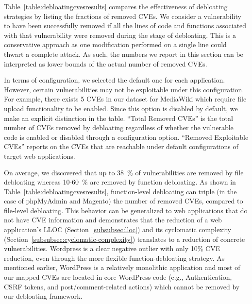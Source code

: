 Table~\ref{table:debloatingcvesresults} compares the effectiveness of
debloating strategies by listing the fractions of removed CVEs. We consider
a vulnerability to have been successfully removed if all the lines of code
and functions associated with that vulnerability were removed during the
stage of debloating. This is a conservative approach as one modification
performed on a single line could thwart a complete attack. As such, the
numbers we report in this section can be interpreted as lower bounds of
the actual number of removed CVEs.


In terms of configuration, we selected the default one for each application.
However, certain vulnerabilities may not be exploitable under this configuration.
For example, there exists 5 CVEs in our dataset for MediaWiki which require file upload functionality to be enabled. Since this option is disabled by default, we make an explicit distinction in the table.
``Total Removed CVEs'' is the total number of CVEs removed by debloating regardless of whether the vulnerable code is enabled or disabled through a configuration option. ``Removed Exploitable CVEs'' reports on the CVEs that are reachable under default configurations of target web applications.

On average, we discovered that up to 38~\% of vulnerabilities are removed by
file debloating whereas 10-60~\% are removed by function debloating. As
shown in Table~\ref{table:debloatingcvesresults}, function-level debloating
can triple (in the case of phpMyAdmin and Magento) the number of removed CVEs, compared to file-level debloating. This
behavior can be generalized to web applications that do not have CVE
information and demonstrates that the reduction of a web application's
LLOC (Section~\ref{subsubsec:lloc}) and its cyclomatic complexity
(Section~\ref{subsubsec:cyclomatic-complexity}) translates to a reduction
of concrete vulnerabilities. Wordpress is a clear negative outlier with only
10\% CVE reduction, even through the more flexible function-debloating
strategy. As mentioned earlier, WordPress is a relatively monolithic
application and most of our mapped CVEs are located in core WordPress code (e.g.,
Authentication, CSRF tokens, and post/comment-related actions) which cannot
be removed by our debloating framework.








